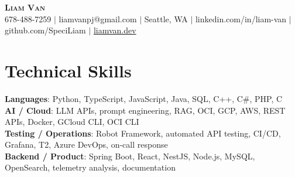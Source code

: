 \documentclass[letterpaper,11pt]{article}
\begin{document}

%
\begin{center}
    \textbf{\Huge \scshape Liam Van} \\ \vspace{1pt}
    \small 678-488-7259 $|$ \small {liamvanpj@gmail.com} $|$ Seattle, WA
 {{$|$ linkedin.com/in/liam-van} {$|$ github.com/SpeciLiam} {$|$ \href{https://liamvan.dev}{liamvan.dev}}}

\end{center}

\section{Technical Skills}
 \begin{itemize}[leftmargin=0.15in, label={}]
    \small{\item{
     \textbf{Languages}{: Python, TypeScript, JavaScript, Java, SQL, C++, C\#, PHP, C} \\
     \textbf{AI / Cloud}{: LLM APIs, prompt engineering, RAG, OCI, GCP, AWS, REST APIs, Docker, GCloud CLI, OCI CLI} \\
     \textbf{Testing / Operations}{: Robot Framework, automated API testing, CI/CD, Grafana, T2, Azure DevOps, on-call response} \\
     \textbf{Backend / Product}{: Spring Boot, React, NestJS, Node.js, MySQL, OpenSearch, telemetry analysis, documentation} \\
    }}
 \end{itemize}
%

\end{document}
